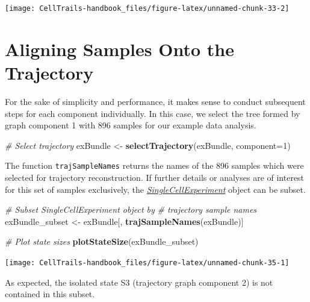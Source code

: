 \documentclass[]{book}
\newenvironment{Shaded}{\begin{snugshade}}{\end{snugshade}}
\newcommand{\KeywordTok}[1]{\textcolor[rgb]{0.13,0.29,0.53}{\textbf{#1}}}
\newcommand{\DataTypeTok}[1]{\textcolor[rgb]{0.13,0.29,0.53}{#1}}
\newcommand{\DecValTok}[1]{\textcolor[rgb]{0.00,0.00,0.81}{#1}}
\newcommand{\StringTok}[1]{\textcolor[rgb]{0.31,0.60,0.02}{#1}}
\newcommand{\CommentTok}[1]{\textcolor[rgb]{0.56,0.35,0.01}{\textit{#1}}}
\newcommand{\NormalTok}[1]{#1}
\theoremstyle{definition}
\theoremstyle{definition}
\theoremstyle{definition}
\theoremstyle{remark}
\begin{document}
\texttt{[image: CellTrails-handbook\_files/figure-latex/unnamed-chunk-33-2]}

\section{Aligning Samples Onto the
Trajectory}\label{aligning-samples-onto-the-trajectory}

For the sake of simplicity and performance, it makes sense to conduct
subsequent steps for each component individually. In this case, we
select the tree formed by graph component 1 with 896 samples for our
example data analysis.

\begin{Shaded}
\begin{Highlighting}[]
\CommentTok{# Select trajectory}
\NormalTok{exBundle <-}\StringTok{ }\KeywordTok{selectTrajectory}\NormalTok{(exBundle, }\DataTypeTok{component=}\DecValTok{1}\NormalTok{)}
\end{Highlighting}
\end{Shaded}

The function \texttt{trajSampleNames} returns the names of the 896
samples which were selected for trajectory reconstruction. If further
details or analyses are of interest for this set of samples exclusively,
the
\emph{\href{http://bioconductor.org/packages/SingleCellExperiment}{SingleCellExperiment}}
object can be subset.

\begin{Shaded}
\begin{Highlighting}[]
\CommentTok{# Subset SingleCellExperiment object by}
\CommentTok{# trajectory sample names}
\NormalTok{exBundle_subset <-}\StringTok{ }\NormalTok{exBundle[, }\KeywordTok{trajSampleNames}\NormalTok{(exBundle)]}

\CommentTok{# Plot state sizes}
\KeywordTok{plotStateSize}\NormalTok{(exBundle_subset)}
\end{Highlighting}
\end{Shaded}

\texttt{[image: CellTrails-handbook\_files/figure-latex/unnamed-chunk-35-1]}

As expected, the isolated state S3 (trajectory graph component 2) is not
contained in this subset.
\end{document}
